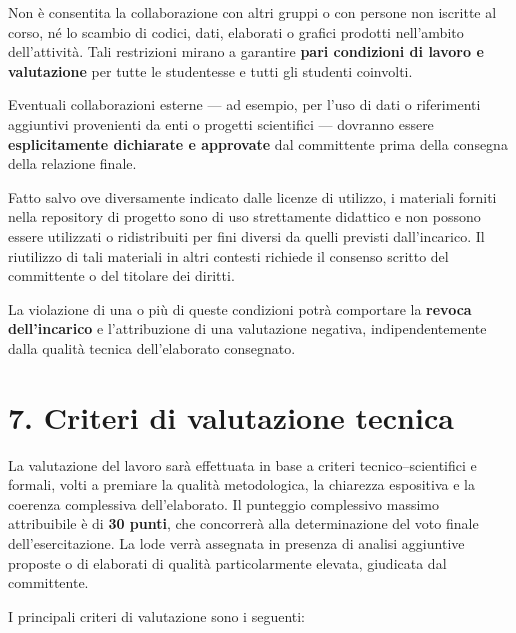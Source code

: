 \documentclass[11pt,a4paper,roman]{moderncv}
\begin{document}
Non è consentita la collaborazione con altri gruppi o con persone non iscritte al corso, né lo scambio di codici, dati, elaborati o grafici prodotti nell’ambito dell’attività.  Tali restrizioni mirano a garantire \textbf{pari condizioni di lavoro e valutazione} per tutte le studentesse e tutti gli studenti coinvolti.

Eventuali collaborazioni esterne — ad esempio, per l’uso di dati o riferimenti aggiuntivi provenienti da enti o progetti scientifici — dovranno essere \textbf{esplicitamente dichiarate e approvate} dal committente prima della consegna della relazione finale.

Fatto salvo ove diversamente indicato dalle licenze di utilizzo, i materiali forniti nella repository di progetto sono di uso strettamente didattico e non possono essere utilizzati o ridistribuiti per fini diversi da quelli previsti dall’incarico.  Il riutilizzo di tali materiali in altri contesti richiede il consenso scritto del committente o del titolare dei diritti.

La violazione di una o più di queste condizioni potrà comportare la \textbf{revoca dell’incarico} e l’attribuzione di una valutazione negativa, indipendentemente dalla qualità tecnica dell’elaborato consegnato.

\section*{7. Criteri di valutazione tecnica}
La valutazione del lavoro sarà effettuata in base a criteri tecnico–scientifici e formali, volti a premiare la qualità metodologica, la chiarezza espositiva e la coerenza complessiva dell’elaborato. Il punteggio complessivo massimo attribuibile è di \textbf{30 punti}, che concorrerà alla determinazione del voto finale dell’esercitazione. La lode verrà assegnata in presenza di analisi aggiuntive proposte o di elaborati di qualità particolarmente elevata, giudicata dal committente.

I principali criteri di valutazione sono i seguenti:
\end{document}
